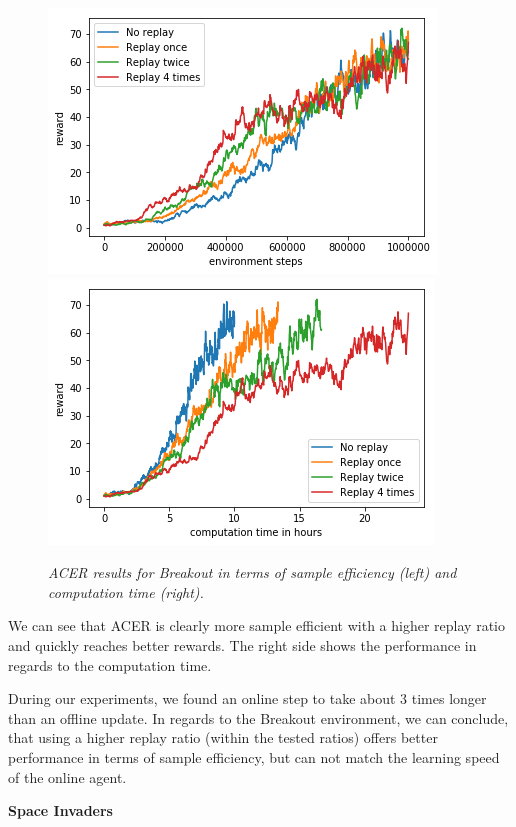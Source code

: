 \begin{figure}[h]
\includegraphics[scale=0.55]{bilder/breakoutbyonline.png}
\includegraphics[scale=0.55]{bilder/breakoutbytime.png}
\caption{\textit {ACER results for Breakout in terms of sample efficiency (left) and computation time (right).}}
\end{figure}

We can see that ACER is clearly more sample efficient with a higher replay ratio and quickly reaches better rewards. 
The right side shows the performance in regards to the computation time. 

During our experiments,  we found an online step to take about 3 times longer than an offline update.
In regards to the Breakout environment, we can conclude, that using a higher replay ratio (within the tested ratios) offers better performance in terms of sample efficiency, but can not match the learning speed of the online agent.

\pagebreak
\begin{center}

\textbf{Space Invaders}
\end{center}


